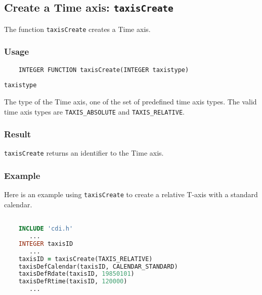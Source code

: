 

\subsection{Create a Time axis: {\tt taxisCreate}}
\label{taxisCreate}

The function {\tt taxisCreate} creates a Time axis.

\subsubsection*{Usage}

\begin{verbatim}
    INTEGER FUNCTION taxisCreate(INTEGER taxistype)
\end{verbatim}

\hspace*{4mm}\begin{minipage}[]{15cm}
\begin{deflist}{\tt taxistype\ }
\item[{\tt taxistype}]
The type of the Time axis, one of the set of predefined {\CDI} time axis types.
                      The valid {\CDI} time axis types are {\tt TAXIS\_ABSOLUTE} and {\tt TAXIS\_RELATIVE}.

\end{deflist}
\end{minipage}

\subsubsection*{Result}

{\tt taxisCreate} returns an identifier to the Time axis.


\subsubsection*{Example}

Here is an example using {\tt taxisCreate} to create a relative T-axis
with a standard calendar.

\begin{lstlisting}[language=Fortran, backgroundcolor=\color{pyellow}, basicstyle=\small, columns=flexible]

    INCLUDE 'cdi.h'
       ...
    INTEGER taxisID
       ...
    taxisID = taxisCreate(TAXIS_RELATIVE)
    taxisDefCalendar(taxisID, CALENDAR_STANDARD)
    taxisDefRdate(taxisID, 19850101)
    taxisDefRtime(taxisID, 120000)
       ...
\end{lstlisting}


